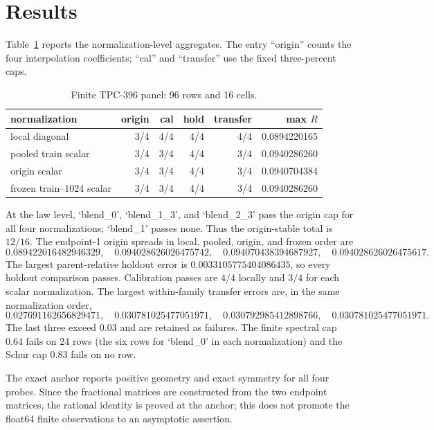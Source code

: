 \documentclass[10pt]{article}
\begin{document}
\section{Results}

Table~\ref{tab:summary} reports the normalization-level aggregates.  The
entry ``origin'' counts the four interpolation coefficients; ``cal'' and
``transfer'' use the fixed three-percent caps.

\begin{table}[t]
\centering
\caption{Finite TPC-396 panel: 96 rows and 16 cells.}
\label{tab:summary}
\small
\begin{tabular}{@{}lrrrrr@{}}
\toprule
normalization & origin & cal & hold & transfer & max $R$\\
\midrule
local diagonal & 3/4 & 4/4 & 4/4 & 4/4 & 0.0894220165\\
pooled train scalar & 3/4 & 3/4 & 4/4 & 3/4 & 0.0940286260\\
origin scalar & 3/4 & 3/4 & 4/4 & 3/4 & 0.0940704384\\
frozen train--1024 scalar & 3/4 & 3/4 & 4/4 & 3/4 & 0.0940286260\\
\bottomrule
\end{tabular}
\end{table}

At the law level, `blend\_0', `blend\_1\_3', and `blend\_2\_3' pass the
origin cap for all four normalizations; `blend\_1' passes none.  Thus the
origin-stable total is $12/16$.  The endpoint-1 origin spreads in local,
pooled, origin, and frozen order are
\[
0.089422016482946329,\quad
0.094028626026475742,\quad
0.094070438394687927,\quad
0.094028626026475617.
\]
The largest parent-relative holdout error is
$0.0033105775404086435$, so every holdout comparison passes.  Calibration
passes are $4/4$ locally and $3/4$ for each scalar normalization.  The largest
within-family transfer errors are, in the same normalization order,
\[
0.027691162656829471,\quad
0.030781025477051971,\quad
0.030792985412898766,\quad
0.030781025477051971.
\]
The last three exceed $0.03$ and are retained as failures.  The finite spectral
cap $0.64$ fails on 24 rows (the six rows for `blend\_0' in each normalization)
and the Schur cap $0.83$ fails on no row.

The exact anchor reports positive geometry and exact symmetry for all four
probes.  Since the fractional matrices are constructed from the two endpoint
matrices, the rational identity is proved at the anchor; this does not promote
the float64 finite observations to an asymptotic assertion.
\end{document}
